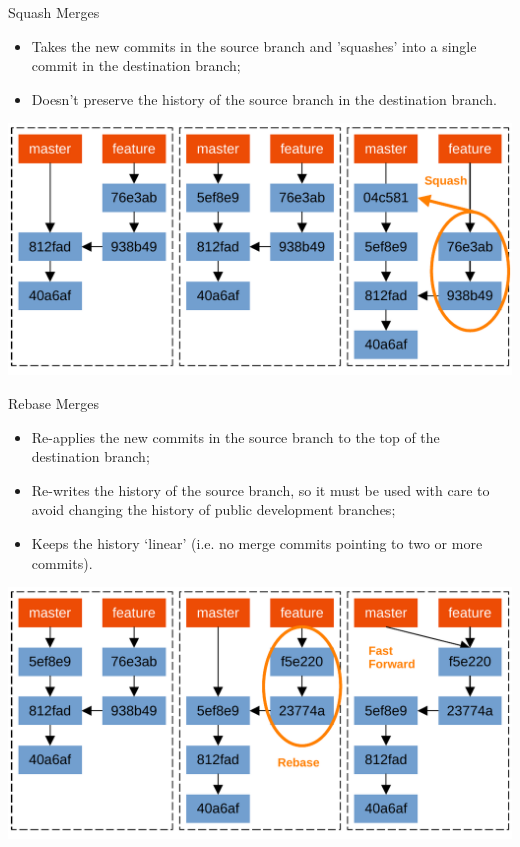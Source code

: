 \documentclass{beamer}
\begin{document}
\begin{frame}{Squash Merges}
  \begin{itemize}
    \item Takes the new commits in the source branch and 'squashes' into a single commit in the destination branch;
    \item Doesn't preserve the history of the source branch in the destination branch.
  \end{itemize}
  \begin{center}
    \includegraphics[scale=0.5]{git-squash-merge}
  \end{center}
\end{frame}

\begin{frame}{Rebase Merges}
  \begin{itemize}
    \item Re-applies the new commits in the source branch to the top of the destination branch;
    \item Re-writes the history of the source branch, so it must be used with care to avoid changing the history of public development branches;
    \item Keeps the history `linear' (i.e. no merge commits pointing to two or more commits).
  \end{itemize}
  \begin{center}
    \includegraphics[scale=0.5]{git-rebase-merge}
  \end{center}
\end{frame}
\end{document}
